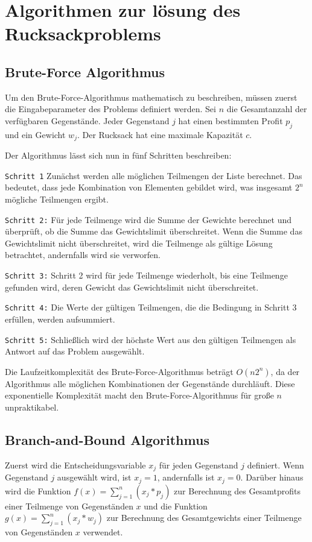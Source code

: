

\newcommand*{\dpd}{\ensuremath{\mathit{dp}}}

\chapter{Algorithmen zur lösung des Rucksackproblems}
\section{Brute-Force Algorithmus}
Um den Brute-Force-Algorithmus mathematisch zu beschreiben, 
müssen zuerst die Eingabeparameter des Problems definiert werden. Sei 
$n$ die Gesamtanzahl der verfügbaren Gegenstände. Jeder 
Gegenstand $j$ hat einen bestimmten Profit $p_j$ und ein Gewicht $w_j$. 
Der Rucksack hat eine maximale Kapazität $c$.

Der Algorithmus lässt sich nun in fünf Schritten beschreiben:

\texttt{Schritt 1}
Zunächst werden alle möglichen Teilmengen der Liste berechnet. 
Das bedeutet, dass jede Kombination von Elementen gebildet 
wird, was insgesamt $2^n$ mögliche Teilmengen ergibt.

\texttt{Schritt 2:}
Für jede Teilmenge wird die Summe der Gewichte berechnet und 
überprüft, ob die Summe das Gewichtslimit  
überschreitet. Wenn die Summe das Gewichtslimit nicht 
überschreitet, wird die Teilmenge als gültige Lösung 
betrachtet, andernfalls wird sie verworfen.

\texttt{Schritt 3:}
Schritt 2 wird für jede Teilmenge wiederholt, bis eine 
Teilmenge gefunden wird, deren Gewicht das Gewichtslimit 
nicht überschreitet.

\texttt{Schritt 4:}
Die Werte der gültigen Teilmengen, die die Bedingung in 
Schritt 3 erfüllen, werden aufsummiert.

\texttt{Schritt 5:}
Schließlich wird der höchste Wert aus den gültigen 
Teilmengen als Antwort auf das Problem ausgewählt.\ \cite[vgl.]{balogun2022explanatory}

Die Laufzeitkomplexität des Brute-Force-Algorithmus beträgt 
$O(n2^n)$, da der Algorithmus alle möglichen Kombinationen der 
Gegenstände durchläuft. Diese exponentielle Komplexität 
macht den Brute-Force-Algorithmus für große $n$ unpraktikabel.\ \cite[vlg.]{hristakeva2005different}

\section{Branch-and-Bound Algorithmus}
Zuerst wird die Entscheidungsvariable $x_j$ für jeden 
Gegenstand $j$ definiert. Wenn Gegenstand $j$ ausgewählt wird, ist $x_j = 1$, 
andernfalls ist $x_j = 0$. Darüber hinaus 
wird die Funktion $f(x) = \sum_{j=1}^{n}(x_j*p_j)$ zur Berechnung des 
Gesamtprofits einer Teilmenge von Gegenständen $x$ und die 
Funktion $g(x) = \sum_{j=1}^{n}(x_j*w_j)$ zur Berechnung des Gesamtgewichts einer 
Teilmenge von Gegenständen $x$ verwendet.

